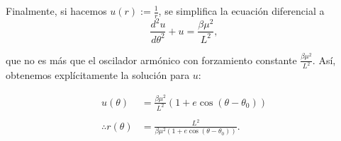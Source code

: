 Finalmente, si hacemos $u(r) := \frac{1}{r}$, se simplifica la ecuación diferencial a
\begin{equation}
 \frac{d^2u}{d\theta^2} + u = \frac{\beta \mu^2}{L^2},
\end{equation}

que no es más que el oscilador armónico con forzamiento constante $\frac{\beta \mu^2}{L^2}$. Así, obtenemos explícitamente la solución para $u$:

\begin{align}
 u(\theta) &= \frac{\beta \mu^2}{L^2} \left( 1 + e \cos (\theta - \theta_0 ) \right) \nonumber \\
 \nonumber \\
 \therefore r(\theta) &= \frac{L^2}{\beta \mu^2 \left(1 + e \cos (\theta - \theta_0) \right)}.
\end{align}


